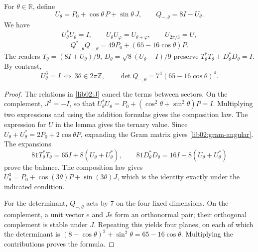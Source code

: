 \begin{theorem}
\label{lib02:Utheta}
For \(\theta\in\mathbb R\), define
\[
 U_\theta=P_0+\cos\theta\,P+\sin\theta\,J,\qquad
 Q_{-,\theta}=8I-U_\theta.
\]
We have
\[
 U_\theta^*U_\theta=I,\qquad
 U_\theta U_\varphi=U_{\theta+\varphi},\qquad U_{2\pi/3}=U,
\]
\begin{equation}
 Q_{-,\theta}^*Q_{-,\theta}
 =49P_0+(65-16\cos\theta)P.
 \label{lib02:gram-angular}
\end{equation}
The readers \(T_\theta=(8I+U_\theta)/9\), \(D_\theta=\sqrt8(U_\theta-I)/9\) preserve \(T_\theta^*T_\theta+D_\theta^*D_\theta=I\). By contrast,
\[
 U_\theta^3=I\ \Longleftrightarrow\ 3\theta\in2\pi\mathbb Z,
 \qquad
 \det Q_{-,\theta}=7^4(65-16\cos\theta)^4.
\]
\end{theorem}
\begin{proof}
The relations in \cref{lib02:J} cancel the terms between sectors. On the complement, \(J^2=-I\), so that \(U_\theta^*U_\theta=P_0+(\cos^2\theta+\sin^2\theta)P=I\). Multiplying two expressions and using the addition formulas gives the composition law. The expression for \(U\) in the lemma gives the ternary value. Since \(U_\theta+U_\theta^*=2P_0+2\cos\theta P\), expanding the Gram matrix gives \eqref{lib02:gram-angular}. The expansions
\[
 81T_\theta^*T_\theta=65I+8(U_\theta+U_\theta^*),\qquad
 81D_\theta^*D_\theta=16I-8(U_\theta+U_\theta^*)
\]
prove the balance. The composition law gives \(U_\theta^3=P_0+\cos(3\theta)P+\sin(3\theta)J\), which is the identity exactly under the indicated condition.

For the determinant, \(Q_{-,\theta}\) acts by 7 on the four fixed dimensions. On the complement, a unit vector \(e\) and \(Je\) form an orthonormal pair; their orthogonal complement is stable under \(J\). Repeating this yields four planes, on each of which the determinant is \((8-\cos\theta)^2+\sin^2\theta=65-16\cos\theta\). Multiplying the contributions proves the formula.
\end{proof}


